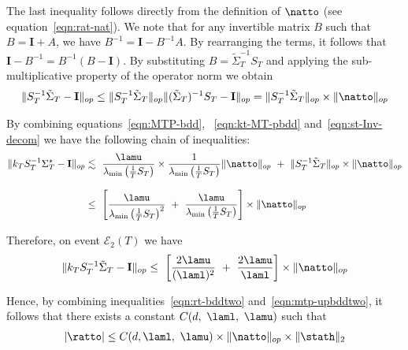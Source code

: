 \documentclass[11pt,letterpaper]{article}
\newcommand{\BT}{{\Sigma^\star_T}}
\newcommand{\Id}{\mathbf{I}}
\newcommand{\PT}{\tilde{\Sigma}_T}
\newcommand{\Etwo}{\mathcal{E}_2(T)}
\theoremstyle{plain}
\theoremstyle{definition}  %
\begin{document}
\noindent The last inequality follows directly from the definition of $\natto$ (see equation~\eqref{eqn:rat-nat}). We note that for any invertible matrix $B$ such that $B = \Id + A$, we have $B^{-1} = \Id - B^{-1}A $. By rearranging the terms, it follows that $\Id -B^{-1} = B^{-1}(B-\Id) $. By substituting $B = \PT^{-1}S_T$ and applying the sub-multiplicative property of the operator norm we obtain 
\begin{align}\label{eqn:st-Inv-decom}
     \| S_T^{-1} \PT - \Id\|_{op} 
     \leq  \| S_T^{-1} \PT \|_{op} \|(\PT)^{-1} S_T - \Id\|_{op} 
     = \| S_T^{-1} \PT \|_{op} \times \| \natto\|_{op}
\end{align}

\noindent By combining equations~\eqref{eqn:MTP-bdd}, ~\eqref{eqn:kt-MT-pbdd} and~\eqref{eqn:st-Inv-decom} we have the following chain of inequalities:
\begin{align*}
    \| k_T S_T^{-1} \BT - \Id  \|_{op} 
    & \lesssim  \ \frac{\lamu}{\lambda_{\min} \left ( \frac{1}{T}S_T \right)} \times \frac{1}{\lambda_{\min} \left( \frac{1}{T} S_T \right)} \| \natto\|_{op}
    \ + \ \| S_T^{-1} \PT \|_{op} \times \| \natto\|_{op} \\[8pt]
    & \leq  \ \left[ \frac{\lamu}{\lambda_{\min} \left ( \frac{1}{T}S_T \right)^2} \ + \ \frac{\lamu}{\lambda_{\min} \left ( \frac{1}{T}S_T \right)} \right] \times \| \natto\|_{op} 
\end{align*}


\noindent Therefore, on event  $\Etwo$ we have
\begin{align}\label{eqn:mtp-upbddtwo}
    \| k_T S_T^{-1} \PT - \Id  \|_{op} 
    \leq \ \left[ \frac{2\lamu}{(\laml)^2} \ + \ \frac{2\lamu}{\laml} \right] \times  \|\natto \|_{op}
\end{align}

\noindent Hence, by combining inequalities~\eqref{eqn:rt-bddtwo} and~\eqref{eqn:mtp-upbddtwo}, it follows that there exists a constant $C(d,\ \laml,\ \lamu)$ such that
\begin{align*}
    |\ratto | \leq C(d,\laml,\ \lamu) \times \|\natto\|_{op} \times \| \stath \|_2
\end{align*}
\end{document}
